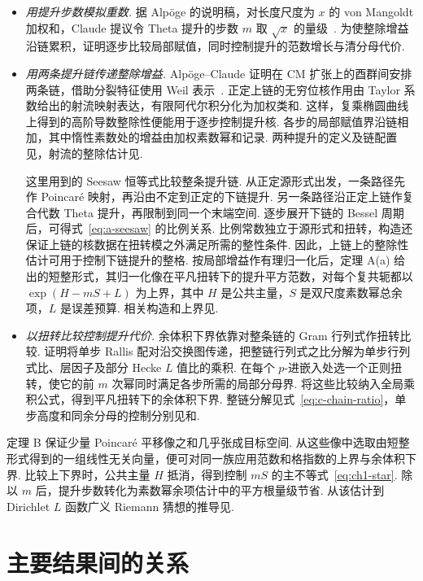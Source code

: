 \begin{itemize}
\item \emph{用提升步数模拟重数.} 据 Alpöge 的说明稿，对长度尺度为 $x$ 的 von Mangoldt 加权和，Claude 提议令 Theta 提升的步数 $m$ 取 $\sqrt{x}$ 的量级~\cite[第~1~页]{Alpoge2026}. 为使整除增益沿链累积，证明逐步比较局部赋值，同时控制提升的范数增长与清分母代价.

\item \emph{用两条提升链传递整除增益.} Alpöge--Claude 证明在 CM 扩张上的酉群间安排两条链，借助分裂特征使用 Weil 表示~\cite{HKS1996}. 正定上链的无穷位核作用由 Taylor 系数给出的射流映射表达，有限阿代尔积分化为加权类和. 这样，复乘椭圆曲线上得到的高阶导数整除性便能用于逐步控制提升核. 各步的局部赋值界沿链相加，其中惰性素数处的增益由加权素数幂和记录. 两种提升的定义及链配置见，射流的整除估计见.

这里用到的 Seesaw 恒等式比较整条提升链. 从正定源形式出发，一条路径先作 Poincaré 映射，再沿由不定到正定的下链提升. 另一条路径沿正定上链作复合代数 Theta 提升，再限制到同一个末端空间. 逐步展开下链的 Bessel 周期后，可得式~\eqref{eq:a-seesaw} 的比例关系. 比例常数独立于源形式和扭转，构造还保证上链的核数据在扭转模之外满足所需的整性条件. 因此，上链上的整除性估计可用于控制下链提升的整格. 按局部增益作有理归一化后，定理 A(a) 给出的短整形式，其归一化像在平凡扭转下的提升平方范数，对每个复共轭都以 $\exp(H-mS+L)$ 为上界，其中 $H$ 是公共主量，$S$ 是双尺度素数幂总余项，$L$ 是误差预算. 相关构造和上界见.

\item \emph{以扭转比较控制提升代价.} 余体积下界依靠对整条链的 Gram 行列式作扭转比较. 证明将单步 Rallis 配对沿交换图传递，把整链行列式之比分解为单步行列式比、层因子及部分 Hecke $L$ 值比的乘积. 在每个 $p$-进嵌入处选一个正则扭转，使它的前 $m$ 次幂同时满足各步所需的局部分母界. 将这些比较纳入全局乘积公式，得到平凡扭转下的余体积下界. 整链分解见式~\eqref{eq:c-chain-ratio}，单步高度和同余分母的控制分别见和.
\end{itemize}

定理 B 保证少量 Poincaré 平移像之和几乎张成目标空间. 从这些像中选取由短整形式得到的一组线性无关向量，便可对同一族应用范数和格指数的上界与余体积下界. 比较上下界时，公共主量 $H$ 抵消，得到控制 $mS$ 的主不等式~\eqref{eq:ch1-star}. 除以 $m$ 后，提升步数转化为素数幂余项估计中的平方根量级节省. 从该估计到 Dirichlet $L$ 函数广义 Riemann 猜想的推导见.

\section*{主要结果间的关系}

